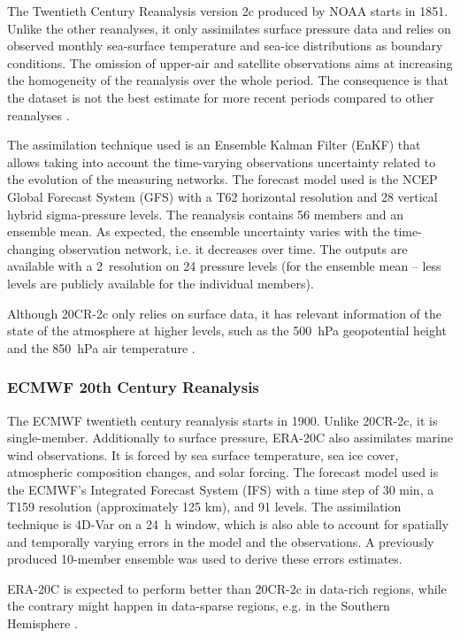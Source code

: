 \documentclass{ametsoc}
\begin{document}
The Twentieth Century Reanalysis version 2c \citep[20CR-2c --][]{Compo2011} produced by NOAA starts in 1851. Unlike the other reanalyses, it only assimilates surface pressure data and relies on observed monthly sea-surface temperature and sea-ice distributions as boundary conditions. The omission of upper-air and satellite observations aims at increasing the homogeneity of the reanalysis over the whole period. The consequence is that the dataset is not the best estimate for more recent periods compared to other reanalyses \citep{Poli2017}.

The assimilation technique used is an Ensemble Kalman Filter (EnKF) that allows taking into account the time-varying observations uncertainty related to the evolution of the measuring networks. The forecast model used is the NCEP Global Forecast System (GFS) with a T62 horizontal resolution and 28 vertical hybrid sigma-pressure levels. The reanalysis contains 56 members and an ensemble mean. As expected, the ensemble uncertainty varies with the time-changing observation network, i.e. it decreases over time. The outputs are available with a 2\degree\ resolution on 24 pressure levels (for the ensemble mean -- less levels are publicly available for the individual members).

Although 20CR-2c only relies on surface data, it has relevant information of the state of the atmosphere at higher levels, such as the 500~hPa geopotential height and the 850~hPa air temperature \citep{Compo2011}.


\subsubsection{ECMWF 20th Century Reanalysis}

The ECMWF twentieth century reanalysis \citep[ERA-20C --][]{Poli2016} starts in 1900. Unlike 20CR-2c, it is single-member. Additionally to surface pressure, ERA-20C also assimilates marine wind observations. It is forced by sea surface temperature, sea ice cover, atmospheric composition changes, and solar forcing. The forecast model used is the ECMWF’s Integrated Forecast System (IFS) with a time step of 30 min, a T159 resolution (approximately 125 km), and 91 levels. The assimilation technique is 4D-Var on a 24~h window, which is also able to account for spatially and temporally varying errors in the model and the observations. A previously produced 10-member ensemble was used to derive these errors estimates.

ERA-20C is expected to perform better than 20CR-2c in data-rich regions, while the contrary might happen in data-sparse regions, e.g. in the Southern Hemisphere \citep{Poli2017}.
\end{document}
